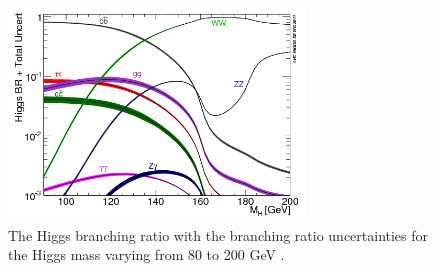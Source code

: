     \begin{figure}[!h]
      \centering
      \includegraphics[width = 0.7\textwidth]{Pictures/Higgs/BRTotalUncertBands_lm.png}
      \caption{The Higgs branching ratio with the branching ratio uncertainties for the Higgs mass varying from 80 to 200 GeV \cite{Denner:2011mq}.}
      \label{fig:higgsProd}
    \end{figure}

%    
%

